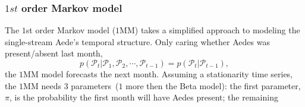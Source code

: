 \documentclass[onecolumn,secnumarabic,amssymb, nobibnotes, aps, pr,superscriptaddress]{revtex4-1}
\def\l{\left}
\def\r{\right}
\begin{document}
\subsubsection{$1st$ order Markov model}

The $1$st order Markov model ($1$MM) takes a simplified approach to modeling the single-stream Aede's temporal structure.
Only caring whether Aedes was present/absent last month,
\begin{equation}
  p \l(\mathcal{P}_{t} | \mathcal{P}_{1}, \mathcal{P}_{2}, \cdots, \mathcal{P}_{t-1} \r) =  p \l(\mathcal{P}_{t} | \mathcal{P}_{t-1}\r),
\end{equation}
the $1$MM model forecasts the next month.
Assuming a stationarity time series, the $1$MM needs $3$ parameters~($1$ more then the Beta model): the first parameter, $\pi$, is the probability the first month will have Aedes present; the remaining
\end{document}
